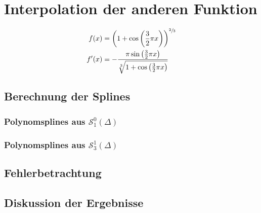 \documentclass[ngerman,a4paper]{texmf/tex/latex/mathscript/mathscript}
\begin{document}
\section{Interpolation der anderen Funktion}
	\begin{align}
		f(x) &= \left( 1+\cos\left(\frac{3}{2}\pi x \right) \right)^{\sfrac{2}{3}}\notag \\
		f'(x) &=-\frac{\pi\sin\left(\frac{3}{2}\pi x\right)}{\sqrt[3]{1+\cos\left(\frac{3}{2}\pi x \right)}}\notag
	\end{align}
	
	\subsection{Berechnung der Splines}
	\subsubsection{Polynomsplines aus $\mathcal{S}_1^0(\Delta)$}
	
	\subsubsection{Polynomsplines aus $\mathcal{S}_3^1(\Delta)$}
	
	\subsection{Fehlerbetrachtung}
	
	\subsection{Diskussion der Ergebnisse}
\end{document}
